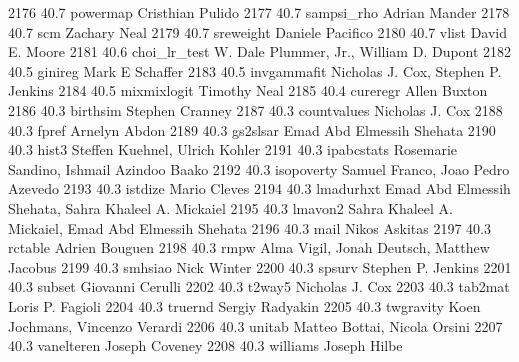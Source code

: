   2176     40.7    powermap      Cristhian Pulido                        
  2177     40.7    sampsi_rho    Adrian Mander                           
  2178     40.7    scm           Zachary Neal                            
  2179     40.7    sreweight     Daniele Pacifico                        
  2180     40.7    vlist         David E. Moore                          
  2181     40.6    choi_lr_test  W. Dale Plummer, Jr., William D. Dupont 
  2182     40.5    ginireg       Mark E Schaffer                         
  2183     40.5    invgammafit   Nicholas J. Cox, Stephen P. Jenkins     
  2184     40.5    mixmixlogit   Timothy Neal                            
  2185     40.4    cureregr      Allen Buxton                            
  2186     40.3    birthsim      Stephen Cranney                         
  2187     40.3    countvalues   Nicholas J. Cox                         
  2188     40.3    fpref         Arnelyn Abdon                           
  2189     40.3    gs2slsar      Emad Abd Elmessih Shehata               
  2190     40.3    hist3         Steffen Kuehnel, Ulrich Kohler          
  2191     40.3    ipabcstats    Rosemarie Sandino, Ishmail Azindoo Baako
  2192     40.3    isopoverty    Samuel Franco, Joao Pedro Azevedo       
  2193     40.3    istdize       Mario Cleves                            
  2194     40.3    lmadurhxt     Emad Abd Elmessih Shehata, Sahra        
                                   Khaleel A. Mickaiel                     
  2195     40.3    lmavon2       Sahra Khaleel A. Mickaiel, Emad Abd     
                                   Elmessih Shehata                        
  2196     40.3    mail          Nikos Askitas                           
  2197     40.3    rctable       Adrien Bouguen                          
  2198     40.3    rmpw          Alma Vigil, Jonah Deutsch, Matthew      
                                   Jacobus                                 
  2199     40.3    smhsiao       Nick Winter                             
  2200     40.3    spsurv        Stephen P. Jenkins                      
  2201     40.3    subset        Giovanni Cerulli                        
  2202     40.3    t2way5        Nicholas J. Cox                         
  2203     40.3    tab2mat       Loris P. Fagioli                        
  2204     40.3    truernd       Sergiy Radyakin                         
  2205     40.3    twgravity     Koen Jochmans, Vincenzo Verardi         
  2206     40.3    unitab        Matteo Bottai, Nicola Orsini            
  2207     40.3    vanelteren    Joseph Coveney                          
  2208     40.3    williams      Joseph Hilbe                            
